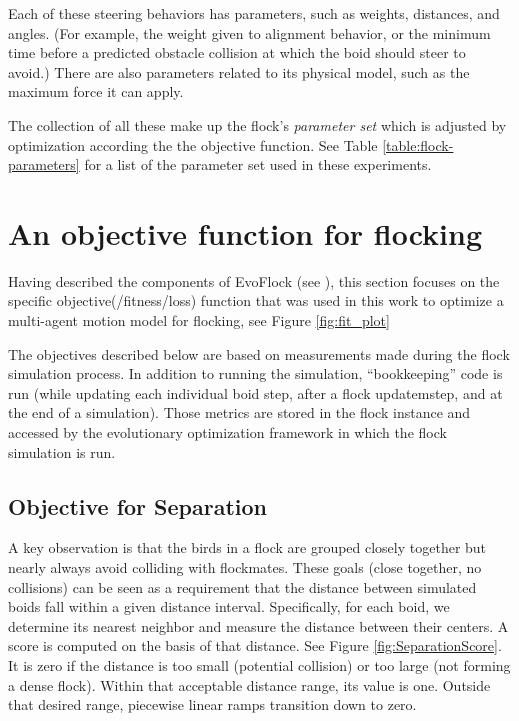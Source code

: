 \documentclass[letterpaper]{article}
\begin{document}
Each of these steering behaviors has parameters, such as weights, distances, and angles. (For example, the weight given to alignment behavior, or the minimum time before a predicted obstacle collision at which the boid should steer to avoid.) There are also parameters related to its physical model, such as the maximum force it can apply.

The collection of all these make up the flock's \textit{parameter set} which is adjusted by optimization according the the objective function. See Table \ref{table:flock-parameters} for a list of the parameter set used in these experiments.

\section{An objective function for flocking}
\label{sec:FlockingObjective}

Having described the components of EvoFlock (see ), this section focuses on the specific objective(/fitness/loss) function that was used in this work to optimize a multi-agent motion model for flocking, see Figure \ref{fig:fit_plot}

The objectives described below are based on measurements made during the flock simulation process. In addition to running the simulation, ``bookkeeping'' code is run (while updating each individual boid step, after a flock updatemstep, and at the end of a simulation). Those metrics are stored in the flock instance and accessed by the evolutionary optimization framework in which the flock simulation is run.

\subsection{Objective for Separation}
\label{subsec:separation_objective}

A key observation is that the birds in a flock are grouped closely together but nearly always avoid colliding with flockmates. These goals (close together, no collisions) can be seen as a requirement that the distance between simulated boids fall within a given distance interval. Specifically, for each boid, we determine its nearest neighbor and measure the distance between their centers. A score is computed on the basis of that distance. See Figure \ref{fig:SeparationScore}. It is zero if the distance is too small (potential collision) or too large (not forming a dense flock). Within that acceptable distance range, its value is one. Outside that desired range, piecewise linear ramps transition down to zero.
\end{document}
